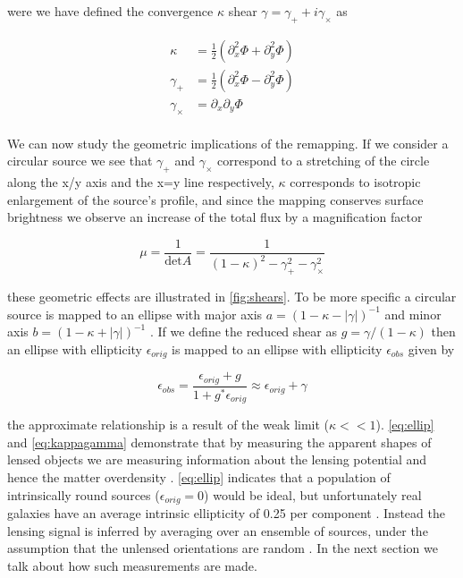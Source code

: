 were we have defined the convergence $\kappa$ shear $\gamma = \gamma_+ + i \gamma_\times$ as 

\begin{equation}
  \begin{split}
   \kappa &= \frac{1}{2}(\partial_x^2 \Phi + \partial_y^2 \Phi)\\
   \gamma_+ &=  \frac{1}{2}(\partial_x^2 \Phi - \partial_y^2 \Phi)\\
   \gamma_\times &=  \partial_x \partial_y \Phi \\
  \end{split}
  \label{eq:kappagamma}
\end{equation}

We can now study the geometric implications of the remapping. If we consider a circular source we see that  $\gamma_+$ and $\gamma_\times$ correspond to a stretching of the circle along the x/y axis and the x=y line respectively, $\kappa$ corresponds to isotropic enlargement of the source's profile, and since the mapping conserves surface brightness we observe an increase of the total flux by a magnification factor

\begin{equation}
  \mu = \frac{1}{\text{det}A} = \frac{1}{(1-\kappa)^2 - \gamma_+^2 - \gamma_\times^2}
  \label{eq:magnificaiton}
\end{equation}

these geometric effects are illustrated in \autoref{fig:shears}. To be more specific a circular source is mapped to an ellipse with major axis $a = (1-\kappa - |\gamma|)^{-1}$ and minor axis $b = (1-\kappa + |\gamma|)^{-1}$ \cite{massey_2013}. If we define the reduced shear as $g = \gamma / (1-\kappa)$ then an ellipse with ellipticity $\epsilon_{orig}$ is mapped to an ellipse with ellipticity $\epsilon_{obs}$ given by 

\begin{equation}
  \epsilon_{obs} = \frac{\epsilon_{orig} + g}{1+g^* \epsilon_{orig}} \approx \epsilon_{orig} + \gamma
  \label{eq:ellip}
\end{equation}

the approximate relationship is a result of the weak limit ($\kappa << 1$). \autoref{eq:ellip} and \autoref{eq:kappagamma} demonstrate that by measuring the apparent shapes of lensed objects we are measuring information about the lensing potential and hence the matter overdensity \cite{rachel_2018,Hoekstra:2013gua,hoekstra}. \autoref{eq:ellip} indicates that a population of intrinsically round sources ($\epsilon_{orig}=0$) would be ideal, but unfortunately real  galaxies  have  an  average  intrinsic ellipticity of 0.25 per component \cite{Hoekstra:2013gua}. Instead the lensing signal is inferred by averaging over an ensemble of sources, under the assumption that the unlensed orientations are random \cite{rachel_2018,Hoekstra:2013gua}. In the next section we talk about how such measurements are made.

